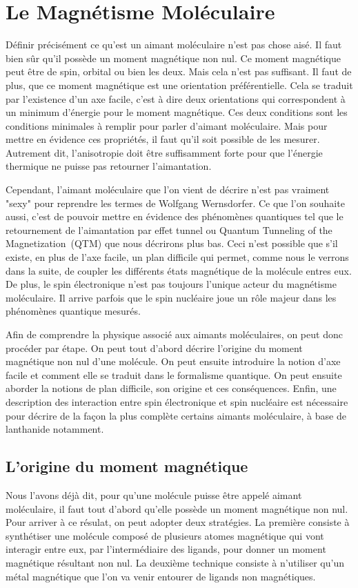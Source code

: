 \chapter{Le Magnétisme Moléculaire}

Définir précisément ce qu'est un aimant moléculaire n'est pas chose aisé. Il faut bien s\^ur qu'il possède un moment magnétique non nul. Ce moment magnétique peut \^etre de spin, orbital ou bien les deux. Mais cela n'est pas suffisant. Il faut de plus, que ce moment magnétique est une orientation préférentielle. Cela se traduit par l'existence d'un axe facile, c'est à dire deux orientations qui correspondent à un minimum d'énergie pour le moment magnétique. Ces deux conditions sont les conditions minimales à remplir pour parler d'aimant moléculaire. Mais pour mettre en évidence ces propriétés, il faut qu'il soit possible de les mesurer. Autrement dit, l'anisotropie doit \^etre suffisamment forte pour que l'énergie thermique ne puisse pas retourner l'aimantation.

Cependant, l'aimant moléculaire que l'on vient de décrire n'est pas vraiment "sexy" pour reprendre les termes de Wolfgang Wernsdorfer. Ce que l'on souhaite aussi, c'est de pouvoir mettre en évidence des phénomènes quantiques tel que le retournement de l'aimantation par effet tunnel ou Quantum Tunneling of the Magnetization~(QTM) que nous décrirons plus bas. Ceci n'est possible que s'il existe, en plus de l'axe facile, un plan difficile qui permet, comme nous le verrons dans la suite, de coupler les différents états magnétique de la molécule entres eux. De plus, le spin électronique n'est pas toujours l'unique acteur du magnétisme moléculaire. Il arrive parfois que le spin nucléaire joue un r\^ole majeur dans les phénomènes quantique mesurés.

Afin de comprendre la physique associé aux aimants moléculaires, on peut donc procéder par étape. On peut tout d'abord décrire l'origine du moment magnétique non nul d'une molécule. On peut ensuite introduire la notion d'axe facile et comment elle se traduit dans le formalisme quantique. On peut ensuite aborder la notions de plan difficile, son origine et ces conséquences. Enfin, une description des interaction entre spin électronique et spin nucléaire est nécessaire pour décrire de la façon la plus complète certains aimants moléculaire, à base de lanthanide notamment.

\section{L'origine du moment magnétique}
Nous l'avons déjà dit, pour qu'une molécule puisse \^etre appelé aimant moléculaire, il faut tout d'abord qu'elle possède un moment magnétique non nul. Pour arriver à ce résulat, on peut adopter deux stratégies. La première consiste à synthétiser une molécule composé de plusieurs atomes magnétique qui vont interagir entre eux, par l'intermédiaire des ligands, pour donner un moment magnétique résultant non nul. La deuxième technique consiste à n'utiliser qu'un métal magnétique que l'on va venir entourer de ligands non magnétiques.


